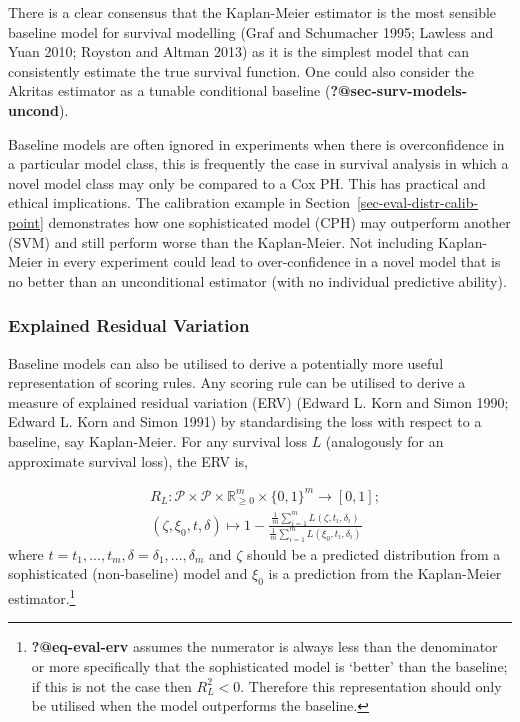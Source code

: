 \documentclass[
  letterpaper,
]{scrbook}
\theoremstyle{plain}
\theoremstyle{definition}
\theoremstyle{remark}
\begin{document}
There is a clear consensus that the Kaplan-Meier estimator is the most
sensible baseline model for survival modelling (Graf and Schumacher
1995; Lawless and Yuan 2010; Royston and Altman 2013) as it is the
simplest model that can consistently estimate the true survival
function. One could also consider the Akritas estimator as a tunable
conditional baseline (\textbf{?@sec-surv-models-uncond}).

Baseline models are often ignored in experiments when there is
overconfidence in a particular model class, this is frequently the case
in survival analysis in which a novel model class may only be compared
to a Cox PH. This has practical and ethical implications. The
calibration example in Section~\ref{sec-eval-distr-calib-point}
demonstrates how one sophisticated model (CPH) may outperform another
(SVM) and still perform worse than the Kaplan-Meier. Not including
Kaplan-Meier in every experiment could lead to over-confidence in a
novel model that is no better than an unconditional estimator (with no
individual predictive ability).

\hypertarget{sec-eval-distr-score-base-erv}{%
\subsubsection{Explained Residual
Variation}\label{sec-eval-distr-score-base-erv}}

Baseline models can also be utilised to derive a potentially more useful
representation of scoring rules. Any scoring rule can be utilised to
derive a measure of explained residual variation (ERV) (Edward L. Korn
and Simon 1990; Edward L. Korn and Simon 1991) by standardising the loss
with respect to a baseline, say Kaplan-Meier. For any survival loss
\(L\) (analogously for an approximate survival loss), the ERV is,

\[
\label{eq:eval_erv}
\begin{split}
&R_L: \mathcal{P}\times \mathcal{P}\times \mathbb{R}_{\geq 0}^m \times \{0,1\}^m \rightarrow [0,1]; \\
&(\zeta,\xi_0,t,\delta) \mapsto 1 - \frac{\frac{1}{m} \sum^{m}_{i = 1} L(\zeta,t_i,\delta_i)}{\frac{1}{m} \sum^{m}_{i = 1} L(\xi_0,t_i,\delta_i)}
\end{split}
\] where \(t = t_1,...,t_m, \delta = \delta_1,...,\delta_m\) and
\(\zeta\) should be a predicted distribution from a sophisticated
(non-baseline) model and \(\xi_0\) is a prediction from the Kaplan-Meier
estimator.\footnote{\textbf{?@eq-eval-erv} assumes the numerator is
  always less than the denominator or more specifically that the
  sophisticated model is `better' than the baseline; if this is not the
  case then \(R_L^2 < 0\). Therefore this representation should only be
  utilised when the model outperforms the baseline.}
\end{document}
